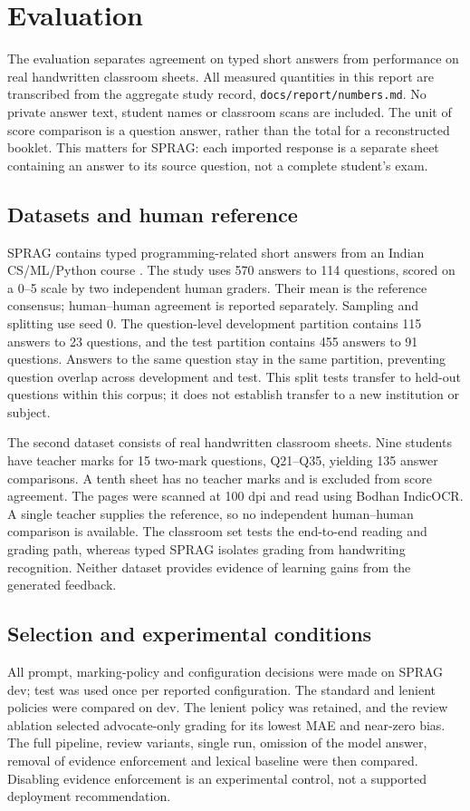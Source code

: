 \section{Evaluation}
\label{sec:evaluation}
The evaluation separates agreement on typed short answers from performance on real handwritten classroom sheets. All measured quantities in this report are transcribed from the aggregate study record, \texttt{docs/report/numbers.md}. No private answer text, student names or classroom scans are included. The unit of score comparison is a question answer, rather than the total for a reconstructed booklet. This matters for SPRAG: each imported response is a separate sheet containing an answer to its source question, not a complete student's exam.

\subsection{Datasets and human reference}
SPRAG contains typed programming-related short answers from an Indian CS/ML/Python course \citep{sprag2025}. The study uses 570 answers to 114 questions, scored on a 0--5 scale by two independent human graders. Their mean is the reference consensus; human--human agreement is reported separately. Sampling and splitting use seed 0. The question-level development partition contains 115 answers to 23 questions, and the test partition contains 455 answers to 91 questions. Answers to the same question stay in the same partition, preventing question overlap across development and test. This split tests transfer to held-out questions within this corpus; it does not establish transfer to a new institution or subject.

The second dataset consists of real handwritten classroom sheets. Nine students have teacher marks for 15 two-mark questions, Q21--Q35, yielding 135 answer comparisons. A tenth sheet has no teacher marks and is excluded from score agreement. The pages were scanned at 100 dpi and read using Bodhan IndicOCR. A single teacher supplies the reference, so no independent human--human comparison is available. The classroom set tests the end-to-end reading and grading path, whereas typed SPRAG isolates grading from handwriting recognition. Neither dataset provides evidence of learning gains from the generated feedback.

\subsection{Selection and experimental conditions}
All prompt, marking-policy and configuration decisions were made on SPRAG dev; test was used once per reported configuration. The standard and lenient policies were compared on dev. The lenient policy was retained, and the review ablation selected advocate-only grading for its lowest MAE and near-zero bias. The full pipeline, review variants, single run, omission of the model answer, removal of evidence enforcement and lexical baseline were then compared. Disabling evidence enforcement is an experimental control, not a supported deployment recommendation.

